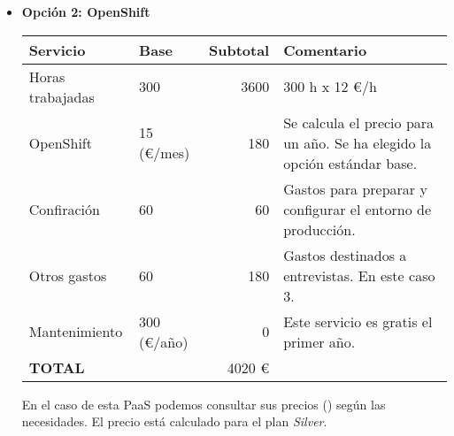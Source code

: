 \begin{itemize}
\item \textbf{Opción 2: OpenShift}
\begin{center}
    \begin{tabular}{| l | l | r | p{5cm} |}
    \hline
    Servicio & Base & Subtotal & Comentario \\ \hline
    Horas trabajadas & 300 & 3600 & 300 h x 12 \euro/h \\ \hline
    OpenShift & 15 (\euro/mes) & 180 & Se calcula el precio para un año. Se ha elegido la opción estándar base.\\ \hline
    Confiración & 60 & 60 & Gastos para preparar y configurar el entorno de producción. \\ \hline 
    Otros gastos & 60 & 180 & Gastos destinados a entrevistas. En este caso 3. \\ \hline 
    Mantenimiento & 300 (\euro/año) & 0 & Este servicio es gratis el primer año. \\ \hline
    \textbf{TOTAL} &  & 4020 \euro & \\
    \hline
    \end{tabular}
\end{center}

En el caso de esta PaaS podemos consultar sus precios (\cite{URL:Openshift_Pircing}) según las necesidades. El precio está calculado para el plan \emph{Silver}.

\end{itemize}

